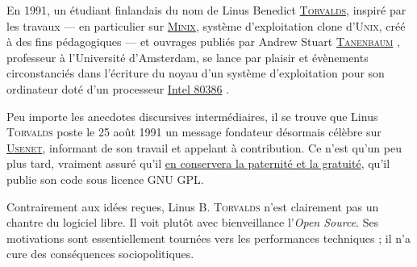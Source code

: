 
En 1991, un étudiant finlandais du nom de Linus Benedict \href{https://fr.wikipedia.org/wiki/Linus_Torvalds}{\textsc{Torvalds}}, inspiré par les travaux --- en particulier sur \href{https://fr.wikipedia.org/wiki/Minix}{\textsc{Minix}}, système d'exploitation clone d'\textsc{\gls{Unix}}, créé à des fins pédagogiques --- et ouvrages publiés par Andrew Stuart \href{https://fr.wikipedia.org/wiki/Andrew_Tanenbaum}{\textsc{Tanenbaum}}
\parencite{Tanenbaum:2008}, professeur à l'Université d'Amsterdam, se lance par plaisir et évènements circonstanciés dans l'écriture du noyau d'un système d'exploitation pour son ordinateur doté d'un processeur \href{https://fr.wikipedia.org/wiki/Intel_80386}{Intel 80386} \parencite{Torvalds:2001}.

Peu importe les anecdotes discursives intermédiaires, il se trouve que Linus \textsc{Torvalds} poste le 25 août 1991 un message fondateur désormais célèbre sur \href{https://fr.wikipedia.org/wiki/Usenet}{\textsc{Usenet}}, informant de son travail et appelant à contribution. Ce n'est qu'un peu plus tard, vraiment assuré qu'il \href{https://www.datacenterknowledge.com/archives/2016/08/23/linus-torvalds-early-linux-history-gpl-license-money}{en conservera la paternité et la gratuité}, qu'il publie son code sous licence GNU GPL.


Contrairement aux idées reçues, Linus B. \textsc{Torvalds} n'est clairement pas un chantre du logiciel libre. Il voit plutôt avec bienveillance l'\textit{Open Source}. Ses motivations sont essentiellement tournées vers les performances techniques ; il n'a cure des conséquences sociopolitiques.

